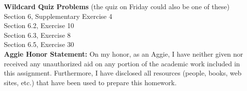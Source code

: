 \documentclass{article}
\theoremstyle{definition}
\newcommand{\honor}{\noindent \textbf{Aggie Honor Statement: }On my honor, as an Aggie, I have neither
  given nor received any unauthorized aid on any portion of the
  academic work included in this assignment. Furthermore, I have
  disclosed all resources (people, books, web sites, etc.) that have
  been used to prepare this homework. 
}
\begin{document}

\goodbreak
\noindent
\textbf{Wildcard Quiz Problems} (the quiz on Friday could also be one of these)\\
Section 6, Supplementary Exercise 4\\
Section 6.2, Exercise 10\\
Section 6.3, Exercise 8\\
Section 6.5, Exercise 30\\



\goodbreak
\honor

\bigskip
\end{document}
